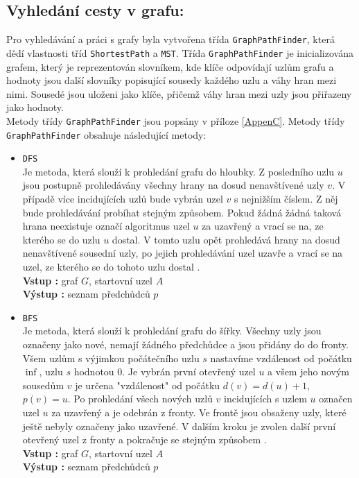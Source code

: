 \subsection{Vyhledání cesty v grafu:}
Pro vyhledávání a práci s grafy byla vytvořena třída \texttt{GraphPathFinder}, která dědí vlastnosti tříd \texttt{ShortestPath} a \texttt{MST}. Třída \texttt{GraphPathFinder} je inicializována grafem, který je reprezentován slovníkem, kde klíče odpovídají uzlům grafu a hodnoty jsou další slovníky popisující sousedy každého uzlu a váhy hran mezi nimi. Sousedé jsou uloženi jako klíče, přičemž váhy hran mezi uzly jsou přiřazeny jako hodnoty.\\
Metody třídy \texttt{GraphPathFinder} jsou popsány v příloze \ref{AppenC}. Metody třídy \texttt{GraphPathFinder} obsahuje následující metody:
\begin{itemize}
    \item \texttt{DFS}\\
    Je metoda, která slouží k prohledání grafu do hloubky. Z posledního uzlu $u$ jsou postupně prohledávány všechny hrany na dosud nenavštívené uzly $v$. V případě více incidujících uzlů bude vybrán uzel $v$ s nejnižším číslem. Z něj bude prohledávání probíhat stejným způsobem. Pokud žádná žádná taková hrana neexistuje označí algoritmus uzel $u$ za uzavřený a vrací se na, ze kterého se do uzlu $u$ dostal. V tomto uzlu opět prohledává hrany na dosud nenavštívené  sousední uzly, po jejich prohledávání uzel uzavře a vrací se na uzel, ze kterého se do tohoto uzlu dostal \cite{Bayer2008}.\\
    \textbf{Vstup : } graf $G$, startovní uzel $A$\\
    \textbf{Výstup : } seznam předchůdců $p$
    
    \item \texttt{BFS}\\
    Je metoda, která slouží k prohledání grafu do šířky. Všechny uzly jsou označeny jako nové, nemají žádného předchůdce a jsou přidány do do fronty. Všem uzlům s výjimkou počátečního uzlu $s$ nastavíme vzdálenost od počátku $\inf$, uzlu $s$ hodnotou 0. Je vybrán první otevřený uzel $u$ a všem jeho novým sousedům $v$ je určena "vzdálenost" od počátku $d(v) = d(u)+1$, $p(v) = u$. Po prohledání všech nových uzlů $v$ incidujících s uzlem $u$ označen uzel $u$ za uzavřený a je odebrán z fronty. Ve frontě jsou obsaženy uzly, které ještě nebyly označeny jako uzavřené. V dalším kroku je zvolen další první otevřený uzel z fronty a pokračuje se stejným způsobem \cite{Bayer2008}.\\
    \textbf{Vstup : } graf $G$, startovní uzel $A$\\
    \textbf{Výstup : } seznam předchůdců $p$
    

\end{itemize}
